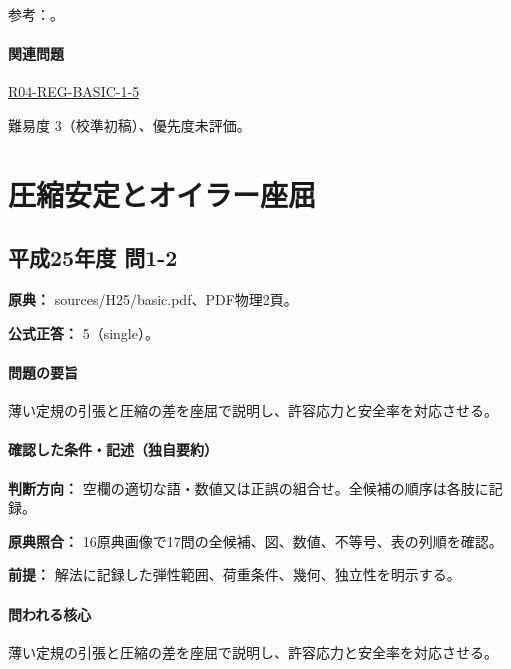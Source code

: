 \par 参考：\cite{struct_mit_beam,struct_mit_buckling,struct_mlit_limit}。

\paragraph{関連問題} \hyperref[q:r04-reg-basic-1-5]{R04-REG-BASIC-1-5}

\par 難易度 3（校準初稿）、優先度未評価。

\section{圧縮安定とオイラー座屈}

\subsection{平成25年度 問1-2}
\label{q:h25-reg-basic-1-2}

\noindent\textbf{原典：} sources/H25/basic.pdf、PDF物理2頁。

\textbf{公式正答：} 5（single）。

\paragraph{問題の要旨} 薄い定規の引張と圧縮の差を座屈で説明し、許容応力と安全率を対応させる。

\paragraph{確認した条件・記述（独自要約）}\mbox{}\par

\noindent\textbf{判断方向：} 空欄の適切な語・数値又は正誤の組合せ。全候補の順序は各肢に記録。\par

\noindent\textbf{原典照合：} 16原典画像で17問の全候補、図、数値、不等号、表の列順を確認。\par

\noindent\textbf{前提：} 解法に記録した弾性範囲、荷重条件、幾何、独立性を明示する。\par

\paragraph{問われる核心} 薄い定規の引張と圧縮の差を座屈で説明し、許容応力と安全率を対応させる。

